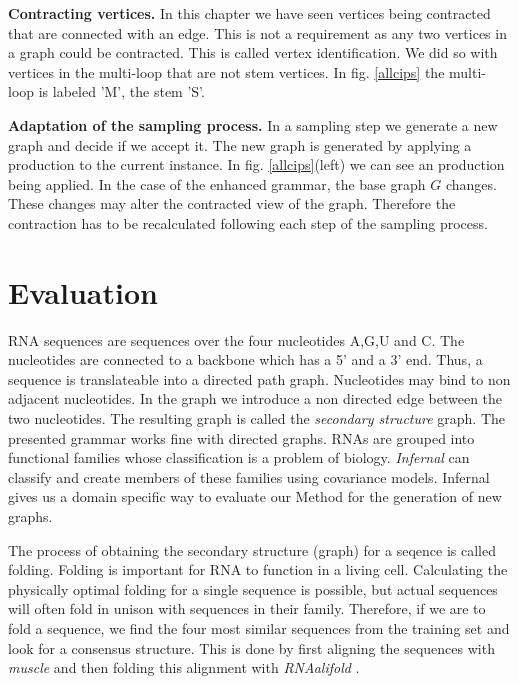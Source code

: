 \documentclass{article}
\begin{document}
\textbf{Contracting vertices.}
In this chapter we have seen vertices being contracted
that are connected with an edge. This is not a requirement
as any two vertices in a graph could be contracted. This
is called vertex identification.  
We did so with vertices in the multi-loop that are not stem vertices.
In fig. \ref{allcips} the multi-loop is labeled 'M', the stem 'S'.

\textbf{Adaptation of the sampling process.}
In a sampling step we generate a new graph and decide if
we accept it. The new graph is generated by applying a
production to the current instance. 
In fig. \ref{allcips}(left) we can see an production being applied. 
In the case of the enhanced grammar, the base graph $G$ changes.
These changes may alter the contracted view of the graph.
Therefore the contraction has to be recalculated following each step
of the sampling process.




\section{Evaluation}
RNA sequences are sequences over the four nucleotides A,G,U and C.
The nucleotides are connected to a backbone which 
has a 5' and a 3' end.
Thus, a sequence is translateable into a directed path graph.
Nucleotides may bind to non adjacent nucleotides.
In the graph we introduce a non directed edge between the two nucleotides.
The resulting graph is called the  \emph{secondary structure} graph.
The presented grammar works fine with directed graphs.
RNAs are grouped into functional families whose classification
is a problem of biology. \emph{Infernal}\cite{infernal} can classify and 
create members of these families using covariance models.
Infernal gives us a domain specific way to evaluate
our Method for the generation of new graphs. 


The process of obtaining the secondary structure (graph) for a seqence is 
called folding. Folding is important for RNA to function in a living cell. 
Calculating the physically optimal folding for a single sequence
is possible, but actual sequences will often fold in unison with 
sequences in their family. Therefore, if we are to fold a sequence,
we find the four most similar sequences from the training set and 
look for a consensus structure.
This is done by first aligning the sequences with \emph{muscle} \cite{muscle}
and then folding this alignment with  \emph{RNAalifold}
\cite{rnaalifold}.  
\end{document}
